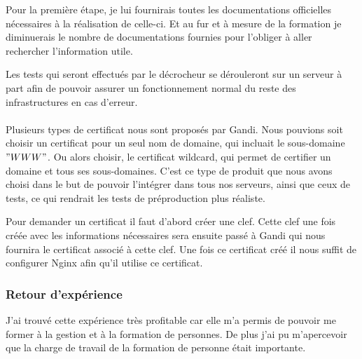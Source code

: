 Pour la première étape, je lui fournirais toutes les documentations officielles nécessaires à la réalisation de celle-ci. Et au fur et à mesure de la formation je diminuerais le nombre de documentations fournies pour l'obliger à aller rechercher l'information utile.

Les tests qui seront effectués par le décrocheur se dérouleront sur un serveur à part afin de pouvoir assurer un fonctionnement normal du reste des infrastructures en cas d'erreur.\\\\

Plusieurs types de certificat nous sont proposés par Gandi. Nous pouvions soit choisir un certificat pour un seul nom de domaine, qui incluait le sous-domaine $"WWW"$. Ou alors choisir, le certificat wildcard, qui permet de certifier un domaine et tous ses sous-domaines. C'est ce type de produit que nous avons choisi dans le but de pouvoir l'intégrer dans tous nos serveurs, ainsi que ceux de tests, ce qui rendrait les tests de préproduction plus réaliste.

Pour demander un certificat il faut d'abord créer une clef. Cette clef une fois créée avec les informations nécessaires sera ensuite passé à Gandi qui nous fournira le certificat associé à cette clef. Une fois ce certificat créé il nous suffit de configurer Nginx afin qu'il utilise ce certificat.

\subsubsection{Retour d'expérience}

J'ai trouvé cette expérience très profitable car elle m'a permis de pouvoir me former à la gestion et à la formation de personnes. De plus j'ai pu m’apercevoir que la charge de travail de la formation de personne était importante.
